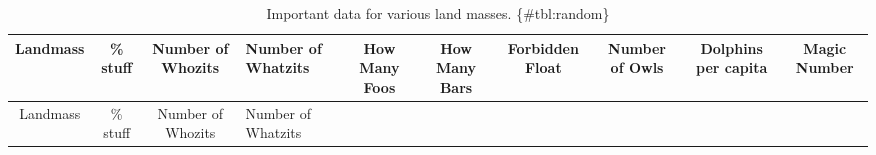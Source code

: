 \begin{longtable}[]{@{}ccclcccccc@{}}
\caption{Important data for various land masses.
\{\#tbl:random\}}\tabularnewline
\toprule
\begin{minipage}[b]{0.09\columnwidth}\centering
Landmass\strut
\end{minipage} & \begin{minipage}[b]{0.06\columnwidth}\centering
\% stuff\strut
\end{minipage} & \begin{minipage}[b]{0.07\columnwidth}\centering
Number of Whozits\strut
\end{minipage} & \begin{minipage}[b]{0.08\columnwidth}\raggedright
Number of Whatzits\strut
\end{minipage} & \begin{minipage}[b]{0.06\columnwidth}\centering
How Many Foos\strut
\end{minipage} & \begin{minipage}[b]{0.06\columnwidth}\centering
How Many Bars\strut
\end{minipage} & \begin{minipage}[b]{0.09\columnwidth}\centering
Forbidden Float\strut
\end{minipage} & \begin{minipage}[b]{0.06\columnwidth}\centering
Number of Owls\strut
\end{minipage} & \begin{minipage}[b]{0.08\columnwidth}\centering
Dolphins per capita\strut
\end{minipage} & \begin{minipage}[b]{0.08\columnwidth}\centering
Magic Number\strut
\end{minipage}\tabularnewline
\midrule
\endfirsthead
\toprule
\begin{minipage}[b]{0.09\columnwidth}\centering
Landmass\strut
\end{minipage} & \begin{minipage}[b]{0.06\columnwidth}\centering
\% stuff\strut
\end{minipage} & \begin{minipage}[b]{0.07\columnwidth}\centering
Number of Whozits\strut
\end{minipage} & \begin{minipage}[b]{0.08\columnwidth}\raggedright
Number of Whatzits\strut
\end{minipage} & \begin{minipage}[b]{0.06\columnwidth}\centering

\end{minipage}
\end{longtable}
